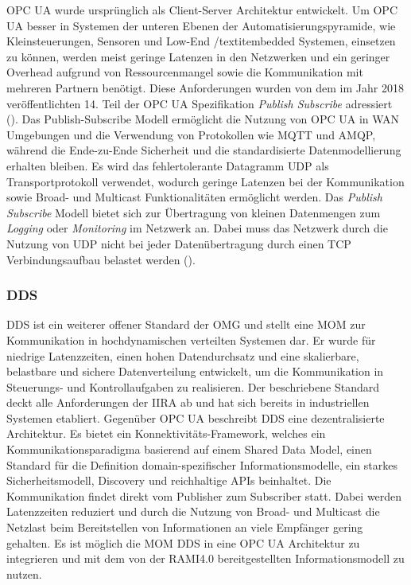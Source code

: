 \ac{OPC UA} wurde ursprünglich als Client-Server Architektur entwickelt. Um \ac{OPC UA} besser in Systemen der unteren Ebenen der Automatisierungspyramide, wie Kleinsteuerungen, Sensoren und Low-End /textit{embedded} Systemen, einsetzen zu können, werden meist geringe Latenzen in den Netzwerken und ein geringer Overhead aufgrund von Ressourcenmangel sowie die Kommunikation mit mehreren Partnern benötigt. Diese Anforderungen wurden von dem im Jahr 2018 veröffentlichten 14. Teil der \ac{OPC UA} Spezifikation \textit{Publish Subscribe} adressiert (\cite{hoppe2018}). Das Publish-Subscribe Modell ermöglicht die Nutzung von \ac{OPC UA} in \ac{WAN} Umgebungen und die Verwendung von Protokollen wie \ac{MQTT} und \ac{AMQP}, während die Ende-zu-Ende Sicherheit und die standardisierte Datenmodellierung erhalten bleiben. Es wird das fehlertolerante Datagramm \ac{UDP} als Transportprotokoll verwendet, wodurch geringe Latenzen bei der Kommunikation sowie Broad- und Multicast Funktionalitäten ermöglicht werden. Das \textit{Publish Subscribe} Modell bietet sich zur Übertragung von kleinen Datenmengen zum \textit{Logging} oder \textit{Monitoring} im Netzwerk an. Dabei muss das Netzwerk durch die Nutzung von \ac{UDP} nicht bei jeder Datenübertragung durch einen \ac{TCP} Verbindungsaufbau belastet werden (\cite{opcpt1}).

\subsubsection{\ac{DDS}}
\ac{DDS} ist ein weiterer offener Standard der \ac{OMG} und stellt eine \ac{MOM} zur Kommunikation in hochdynamischen verteilten Systemen dar. Er wurde für niedrige Latenzzeiten, einen hohen Datendurchsatz und eine skalierbare, belastbare und sichere Datenverteilung entwickelt, um die Kommunikation in Steuerungs- und Kontrollaufgaben zu realisieren. Der beschriebene Standard deckt alle Anforderungen der \ac{IIRA} ab und hat sich bereits in industriellen Systemen etabliert. Gegenüber \ac{OPC UA} beschreibt \ac{DDS} eine dezentralisierte Architektur. Es bietet ein Konnektivitäts-Framework, welches ein Kommunikationsparadigma basierend auf einem Shared Data Model, einen Standard für die Definition domain-spezifischer Informationsmodelle, ein starkes Sicherheitsmodell, Discovery und reichhal­tige APIs beinhaltet. Die Kommunikation findet direkt vom Publisher zum Subscriber statt. Dabei werden Latenzzeiten reduziert und durch die Nutzung von Broad- und Multicast die Netzlast beim Bereitstellen von Informationen an viele Empfänger gering gehalten. Es ist möglich die \ac{MOM} \ac{DDS} in eine \ac{OPC UA} Architektur zu integrieren und mit dem von der \ac{RAMI4.0} bereitgestellten Informationsmodell zu nutzen.

